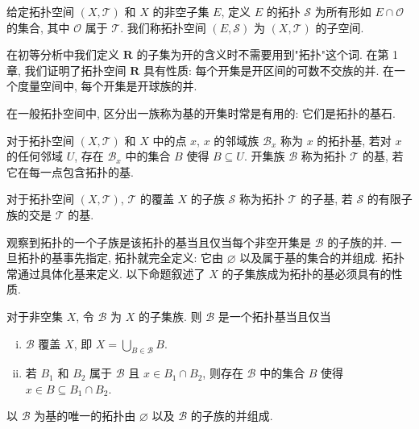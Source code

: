 \documentclass[../../main.tex]{subfiles}
\begin{document}
\begin{example}[拓扑子空间]\label{example:ch11-拓扑子空间}
给定拓扑空间 $(X,\mathcal{T})$ 和 $X$ 的非空子集 $E$, 定义 $E$ 的拓扑 $\mathcal{S}$ 为所有形如 $E\cap\mathcal{O}$ 的集合, 其中 $\mathcal{O}$ 属于 $\mathcal{T}$. 我们称拓扑空间 $(E,\mathcal{S})$ 为 $(X,\mathcal{T})$ 的子空间.
\end{example}

在初等分析中我们定义 $\mathbf{R}$ 的子集为开的含义时不需要用到"拓扑"这个词. 在第 1 章, 我们证明了拓扑空间 $\mathbf{R}$ 具有性质: 每个开集是开区间的可数不交族的并. 在一个度量空间中, 每个开集是开球族的并.

在一般拓扑空间中, 区分出一族称为基的开集时常是有用的: 它们是拓扑的基石.

\begin{definition}[基与子基]\label{definition:ch11-基}
对于拓扑空间 $(X,\mathcal{T})$ 和 $X$ 中的点 $x$, $x$ 的邻域族 $\mathcal{B}_{x}$ 称为 $x$ 的拓扑基, 若对 $x$ 的任何邻域 $U$, 存在 $\mathcal{B}_{x}$ 中的集合 $B$ 使得 $B\subseteq U$. 开集族 $\mathcal{B}$ 称为拓扑 $\mathcal{T}$ 的基, 若它在每一点包含拓扑的基.

对于拓扑空间 $(X,\mathcal{T})$, $\mathcal{T}$ 的覆盖 $X$ 的子族 $\mathcal{S}$ 称为拓扑 $\mathcal{T}$ 的子基, 若 $\mathcal{S}$ 的有限子族的交是 $\mathcal{T}$ 的基.
\end{definition}

观察到拓扑的一个子族是该拓扑的基当且仅当每个非空开集是 $\mathcal{B}$ 的子族的并. 一旦拓扑的基事先指定, 拓扑就完全定义: 它由 $\varnothing$ 以及属于基的集合的并组成. 拓扑常通过具体化基来定义. 以下命题叙述了 $X$ 的子集族成为拓扑的基必须具有的性质.

\begin{proposition}\label{proposition:ch11-基判别}
对于非空集 $X$, 令 $\mathcal{B}$ 为 $X$ 的子集族. 则 $\mathcal{B}$ 是一个拓扑基当且仅当
\begin{enumerate}[(i)]
\item $\mathcal{B}$ 覆盖 $X$, 即 $X=\bigcup_{B\in\mathcal{B}}B$.
\item 若 $B_{1}$ 和 $B_{2}$ 属于 $\mathcal{B}$ 且 $x\in B_{1}\cap B_{2}$, 则存在 $\mathcal{B}$ 中的集合 $B$ 使得 $x\in B\subseteq B_{1}\cap B_{2}$.
\end{enumerate}
以 $\mathcal{B}$ 为基的唯一的拓扑由 $\varnothing$ 以及 $\mathcal{B}$ 的子族的并组成.
\end{proposition}
\end{document}
